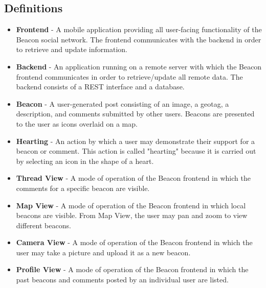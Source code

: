 \subsection{Definitions}
\begin{itemize}
    \item \textbf{Frontend} - A mobile application providing all user-facing
        functionality of the Beacon social network. The frontend communicates
        with the backend in order to retrieve and update information.

    \item \textbf{Backend} - An application running on a remote server with which
        the Beacon frontend communicates in order to retrieve/update all remote
        data. The backend consists of a REST interface and a database.

    \item \textbf{Beacon} - A user-generated post consisting of an image, a geotag,
        a description, and comments submitted by other users. Beacons are presented
        to the user as icons overlaid on a map.

    \item \textbf{Hearting} - An action by which a user may demonstrate their support
        for a beacon or comment. This action is called "hearting" because it is
        carried out by selecting an icon in the shape of a heart.

    \item \textbf{Thread View} - A mode of operation of the Beacon frontend in which
        the comments for a specific beacon are visible.

    \item \textbf{Map View} - A mode of operation of the Beacon frontend in which
        local beacons are visible. From Map View, the user may pan and zoom to view
        different beacons.
        
    \item \textbf{Camera View} - A mode of operation of the Beacon frontend in which
        the user may take a picture and upload it as a new beacon.

    \item \textbf{Profile View} - A mode of operation of the Beacon frontend in which
        the past beacons and comments posted by an individual user are listed.

\end{itemize}
    
